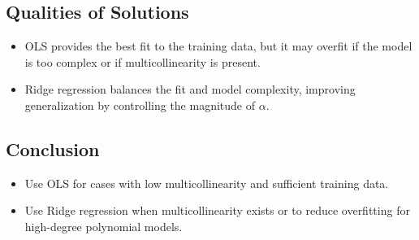\subsection*{Qualities of Solutions}
\begin{itemize}
    \item OLS provides the best fit to the training data, but it may overfit if the model is too complex or if multicollinearity is present.
    \item Ridge regression balances the fit and model complexity, improving generalization by controlling the magnitude of $\alpha$.
\end{itemize}

\subsection*{Conclusion}
\begin{itemize}
    \item Use OLS for cases with low multicollinearity and sufficient training data.
    \item Use Ridge regression when multicollinearity exists or to reduce overfitting for high-degree polynomial models.
\end{itemize}

